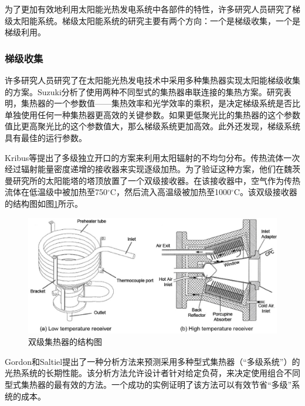 为了更加有效地利用太阳能光热发电系统中各部件的特性，许多研究人员研究了梯级太阳能系统。梯级太阳能系统的研究主要有两个方向：一个是梯级收集，一个是梯级利用。

\subsubsection{梯级收集}

许多研究人员研究了在太阳能光热发电技术中采用多种集热器实现太阳能梯级收集的方案。Suzuki\cite{Suzuki1986}分析了使用两种不同型式的集热器串联连接的集热方案。研究表明，集热器的一个参数值——集热效率和光学效率的乘积，是决定梯级系统是否比单独使用任何一种集热器更高效的关键参数。如果更低聚光比的集热器的这个参数值比更高聚光比的这个参数值大，那么梯级系统更加高效。此外还发现，梯级系统具有最佳的运行参数。

Kribus等\cite{Kribus1999}提出了多级独立开口的方案来利用太阳辐射的不均匀分布。传热流体一次经过辐射能量密度递增的接收器来实现逐级加热。为了验证这种方案，他们在魏茨曼研究所的太阳能塔的塔顶放置了一个双级接收器。在该接收器中，空气作为传热流体在低温级中被加热至750$\mathrm{^\circ C}$，然后流入高温级被加热至1000$\mathrm{^\circ C}$。该双级接收器的结构图如图\ref{fig:Kribus1999}所示。

\begin{figure}[!ht]
\centering
\includegraphics[width=.8\textwidth]{fig/Kribus1999.jpg}
\caption{双级集热器的结构图}
\label{fig:Kribus1999}
\end{figure}

Gordon和Saltiel提出了一种分析方法来预测采用多种型式集热器（“多级系统”）的光热系统的长期性能。该分析方法允许设计者针对给定负荷，来决定使用组合不同型式集热器的最有效的方法。一个成功的实例证明了该方法可以有效节省“多级”系统的成本。

